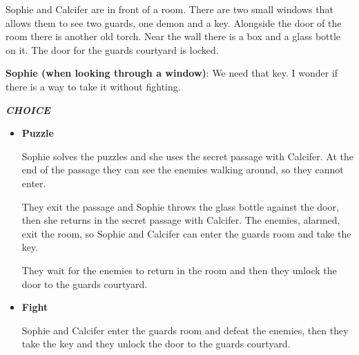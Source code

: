 
Sophie and Calcifer are in front of a room. There are two small windows that allows them to see two guards, one demon and a key. Alongside the door of the room there is another old torch. Near the wall there is a box and a glass bottle on it. The door for the guards courtyard is locked.

\textbf{Sophie (when looking through a window)}: We need that key. I wonder if there is a way to take it without fighting.

\textit{\textbf{CHOICE}}
\begin{itemize}
  \item \textbf{Puzzle}
  
  Sophie solves the puzzles and she uses the secret passage with Calcifer. At the end of the passage they can see the enemies walking around, so they cannot enter.
  
  They exit the passage and Sophie throws the glass bottle against the door, then she returns in the secret passage with Calcifer. The enemies, alarmed, exit the room, so Sophie and Calcifer can enter the guards room and take the key.
  
  They wait for the enemies to return in the room and then they unlock the door to the guards courtyard.

  \item \textbf{Fight}
  
  Sophie and Calcifer enter the guards room and defeat the enemies, then they take the key and they unlock the door to the guards courtyard.
\end{itemize}


